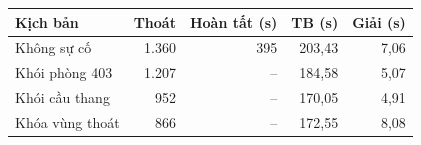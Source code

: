 \small\begin{tabular}{lrrrr}
\toprule
Kịch bản & Thoát & Hoàn tất (s) & TB (s) & Giải (s)\\\midrule
Không sự cố & 1.360 & 395 & 203,43 & 7,06\\
Khói phòng 403 & 1.207 & -- & 184,58 & 5,07\\
Khói cầu thang & 952 & -- & 170,05 & 4,91\\
Khóa vùng thoát & 866 & -- & 172,55 & 8,08\\
\bottomrule\end{tabular}

